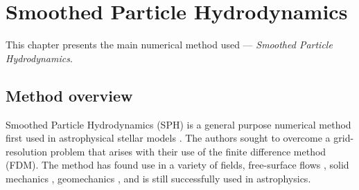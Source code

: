 \documentclass[../main.tex]{subfiles}
\begin{document}
\chapter{Smoothed Particle Hydrodynamics}
\label{chap:SPH}

This chapter presents the main numerical method used --- \emph{Smoothed Particle Hydrodynamics}.

\section{Method overview}
\label{sec:SPH_OVERVIEW}

Smoothed Particle Hydrodynamics (SPH) is a general purpose numerical method first used in astrophysical stellar models \autocite{gingoldSmoothedParticleHydrodynamics1977}. The authors sought to overcome a grid-resolution problem that arises with their use of the finite difference method (FDM). The method has found use in a variety of fields, \viz free-surface flows \autocite{monaghanSimulatingFreeSurface1994a}, solid mechanics \autocite{liberskySmoothParticleHydrodynamics1991}, geomechanics \autocite{buiLagrangianMeshfreeParticles2008}, and is still successfully used in astrophysics\autocite{springelSimulationsFormationEvolution2005a}. 
\end{document}
